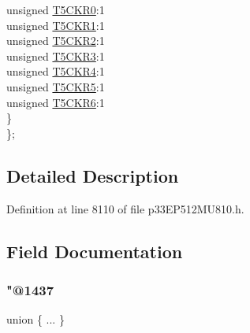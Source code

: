 \begin{DoxyCompactItemize}
\begin{tabbing}
\>\>unsigned \hyperlink{structtag_r_p_i_n_r4_b_i_t_s_ad9c4b24469da583947ae2ba96dba9a66}{T5CKR0}:1\\
\>\>unsigned \hyperlink{structtag_r_p_i_n_r4_b_i_t_s_a8000a1cd07ea4f288475b11f2b6f60a4}{T5CKR1}:1\\
\>\>unsigned \hyperlink{structtag_r_p_i_n_r4_b_i_t_s_a635c4cc5e78701db86f82e75c3a22aca}{T5CKR2}:1\\
\>\>unsigned \hyperlink{structtag_r_p_i_n_r4_b_i_t_s_aa337786b8af9a09a7d02e2d7ecf55dc9}{T5CKR3}:1\\
\>\>unsigned \hyperlink{structtag_r_p_i_n_r4_b_i_t_s_a0add65b57a70d7618a2534684169baaf}{T5CKR4}:1\\
\>\>unsigned \hyperlink{structtag_r_p_i_n_r4_b_i_t_s_ac25e67ca0130a194694fa1fa338102c1}{T5CKR5}:1\\
\>\>unsigned \hyperlink{structtag_r_p_i_n_r4_b_i_t_s_ac22116ad9599c4ce6379d42b5f7bbc0d}{T5CKR6}:1\\
\>\} \\
\}; \\

\end{tabbing}\end{DoxyCompactItemize}


\subsection{Detailed Description}


Definition at line 8110 of file p33\+E\+P512\+M\+U810.\+h.



\subsection{Field Documentation}
\mbox{\label{structtag_r_p_i_n_r4_b_i_t_s_a6d048f3049e99c660d9a0e9576c1342b}} 
\subsubsection{\texorpdfstring{"@1437}{@1437}}
{\footnotesize\ttfamily union \{ ... \} }

\mbox{\label{structtag_r_p_i_n_r4_b_i_t_s_adf71f3d8410c1f1dbbc96680a92c49af}} 
